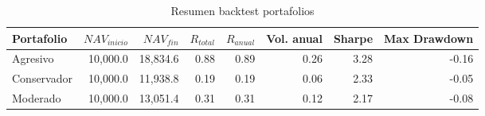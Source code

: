 \begin{table}[htbp]
\centering
\begin{tabular}{lrrrrrrr}
\hline
Portafolio & $NAV_{inicio}$ & $NAV_{fin}$ & $R_{total}$ & $R_{anual}$ & Vol. anual & Sharpe & Max Drawdown \\
\hline
Agresivo & 10,000.0 & 18,834.6 & 0.88 & 0.89 & 0.26 & 3.28 & -0.16 \\
Conservador & 10,000.0 & 11,938.8 & 0.19 & 0.19 & 0.06 & 2.33 & -0.05 \\
Moderado & 10,000.0 & 13,051.4 & 0.31 & 0.31 & 0.12 & 2.17 & -0.08 \\
\hline
\end{tabular}
\caption{Resumen backtest portafolios}
\label{tab:backtest-resumen}
\end{table}